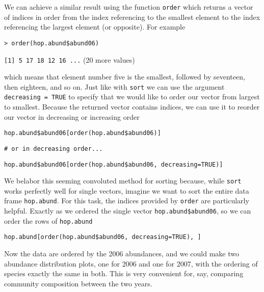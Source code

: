 \documentclass[12pt]{article}
\newcommand{\R}[1] {
	\item \texttt{#1}
}
\newenvironment{verbatim}{ 
	\indent
	\begin{list}{}{\setlength{\itemsep}{-1.5mm}}
}{
	\end{list}
}
\begin{document}
We can achieve a similar result using the function \verb+order+ which returns a vector of indices in order from the index referencing to the smallest element to the index referencing the largest element (or opposite). For example
\begin{verbatim}
	\R{> order(hop.abund\$abund06)}
	\R{[1] 5 17 18 12 16 ...} (20 more values)
\end{verbatim}
which means that element number five is the smallest, followed by seventeen, then eighteen, and so on.  Just like with \verb+sort+ we can use the argument \verb+decreasing = TRUE+ to specify that we would like to order our vector from largest to smallest.  Because the returned vector contains indices, we can use it to reorder our vector in decreasing or increasing order
\begin{verbatim}
	\R{hop.abund\$abund06[order(hop.abund\$abund06)]}
	\R{\# or in decreasing order...}
	\R{hop.abund\$abund06[order(hop.abund\$abund06, decreasing=TRUE)]}
\end{verbatim}
We belabor this seeming convoluted method for sorting because, while \verb+sort+ works perfectly well for single vectors, imagine we want to sort the entire data frame \verb+hop.abund+.  For this task, the indices provided by \verb+order+ are particularly helpful.  Exactly as we ordered the single vector \verb+hop.abund$abund06+, so we can order the rows of \verb+hop.abund+
\begin{verbatim}
	\R{hop.abund[order(hop.abund\$abund06, decreasing=TRUE), ]}
\end{verbatim}
Now the data are ordered by the 2006 abundances, and we could make two abundance distribution plots, one for 2006 and one for 2007, with the ordering of species exactly the same in both.  This is very convenient for, say, comparing community composition between the two years.
\end{document}
